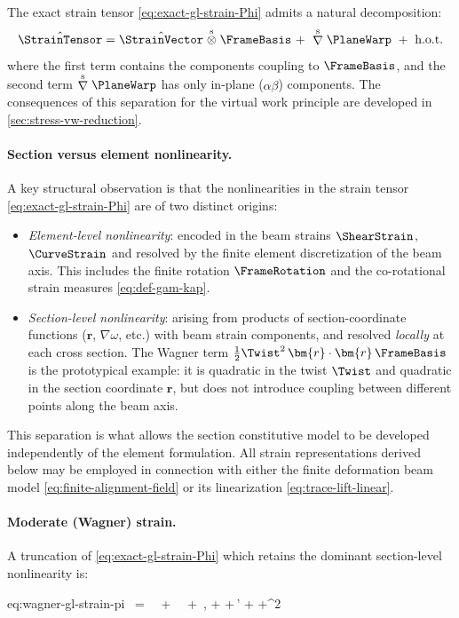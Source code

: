 The exact strain tensor \eqref{eq:exact-gl-strain-Phi} admits a natural decomposition:
\begin{equation}
\hat{\StrainTensor}
= \hat{\StrainVector}\stackrel{\mathrm{s}}{\otimes}\FrameBasis
~+~\stackrel{\rm s}{\nabla}\PlaneWarp
~+~\text{h.o.t.}
\label{eq:strain-decomposition}
\end{equation}
where the first term contains the components coupling to \(\FrameBasis\), and the second term \(\stackrel{\rm s}{\nabla}\PlaneWarp\) has only in-plane (\(\alpha\beta\)) components. 
The consequences of this separation for the virtual work principle are developed in \cref{sec:stress-vw-reduction}.

\paragraph{Section versus element nonlinearity.}
A key structural observation is that the nonlinearities in the strain tensor \eqref{eq:exact-gl-strain-Phi} are of two distinct origins:
\begin{itemize}
    \item \emph{Element-level nonlinearity}: encoded in the beam strains \(\ShearStrain\), \(\CurveStrain\) and resolved by the finite element discretization of the beam axis. This includes the finite rotation \(\FrameRotation\) and the co-rotational strain measures \eqref{eq:def-gam-kap}.
    \item \emph{Section-level nonlinearity}: arising from products of section-coordinate functions (\(\bm{r}\), \(\nabla\omega\), etc.) with beam strain components, and resolved \emph{locally} at each cross section. The Wagner term \(\tfrac{1}{2}\Twist^2\,\bm{r}\cdot\bm{r}\,\FrameBasis\) is the prototypical example: it is quadratic in the twist \(\Twist\) and quadratic in the section coordinate \(\bm{r}\), but does not introduce coupling between different points along the beam axis.
\end{itemize}
This separation is what allows the section constitutive model to be developed independently of the element formulation. 
All strain representations derived below may be employed in connection with either the finite deformation beam model \eqref{eq:finite-alignment-field} or its linearization \eqref{eq:trace-lift-linear}.

\paragraph{Moderate (Wagner) strain.}
A truncation of \eqref{eq:exact-gl-strain-Phi} which retains the dominant section-level nonlinearity is:
\begin{SaveEquation}{eq:wagner-gl-strain-pi}
\hat{\StrainTensor}
~=~\hat{\StrainVector}\FrameBasis
~+~\PlaneWarp
~+~,
\qquad
%
\hat{\StrainVector}\coloneq
\bm{\gamma}
+\bm{\kappa}\times{}
+\bm{\Phi}\,\bm{\alpha}'
+\nabla\AxialWarp
+\Twist^2\,
\cdot{}\,\FrameBasis
\end{SaveEquation}

